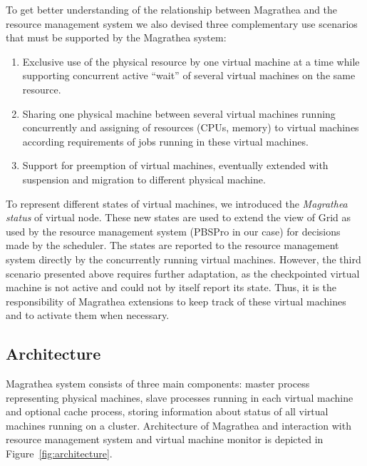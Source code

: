 \documentclass{sig-alternate}
\begin{document}
To get better understanding of the relationship between Magrathea and the
resource management system we also devised three complementary use scenarios
that must be supported by the Magrathea system:
\begin{enumerate}
\item Exclusive use of the physical resource by one virtual machine at a
time while supporting concurrent active ``wait'' of several virtual
machines on the same resource.
\item Sharing one physical machine between several virtual machines
running concurrently and assigning of resources (CPUs, memory) to virtual
machines according requirements of jobs running in these virtual
machines.
\item Support for preemption of virtual machines, eventually extended with
suspension and migration to different physical machine.
\end{enumerate}

To represent different states of virtual machines, we introduced
the \textit{Magrathea status} of virtual node. These new states are used
to extend the view of Grid as used by the resource management system
(PBSPro in our case) for decisions made by the scheduler.
The states are reported to the resource management system
directly by the concurrently running virtual machines. However, the third
scenario presented above requires further adaptation, as the checkpointed
virtual machine is not active and could not by itself report its state.
Thus, it is the responsibility of Magrathea extensions to keep track of these
virtual machines and to activate them when necessary.

\subsection{Architecture} 

Magrathea system consists of three main components: master process representing physical machines, slave processes
running in each virtual machine and optional cache process, storing information about status of all virtual machines 
running on a cluster. Architecture of Magrathea and interaction with resource 
management system and virtual machine monitor is depicted in Figure~\ref{fig:architecture}.
\end{document}
